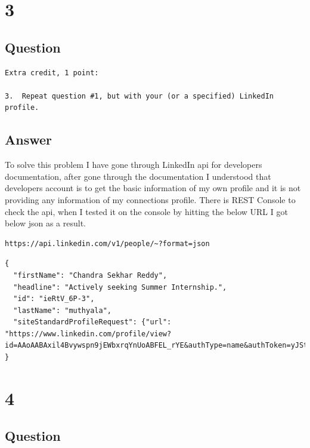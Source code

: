\documentclass[letterpaper,11pt]{article}
\begin{document}
\clearpage


\section*{3}

\subsection*{Question}

\begin{verbatim}
Extra credit, 1 point:

3.  Repeat question #1, but with your (or a specified) LinkedIn profile.
\end{verbatim}

\clearpage
\subsection*{Answer}

To solve this problem I have gone through LinkedIn api for developers documentation, after gone through the documentation I understood that developers account is to get the basic information of my own profile and it is not providing any information of my connections profile. There is REST Console to check the api, when I tested it on the console by hitting the below URL I got below json as a result.
\begin{lstlisting}[frame=single]
https://api.linkedin.com/v1/people/~?format=json
\end{lstlisting}
\begin{lstlisting}[frame=single]
{
  "firstName": "Chandra Sekhar Reddy",
  "headline": "Actively seeking Summer Internship.",
  "id": "ieRtV_6P-3",
  "lastName": "muthyala",
  "siteStandardProfileRequest": {"url": "https://www.linkedin.com/profile/view?id=AAoAABAxil4Bvywspn9jEWbxrqYnUoABFEL_rYE&authType=name&authToken=yJSt&trk=api*a3227641*s3301901*"}
}
\end{lstlisting}
\clearpage


\section*{4}

\subsection*{Question}
\end{document}
